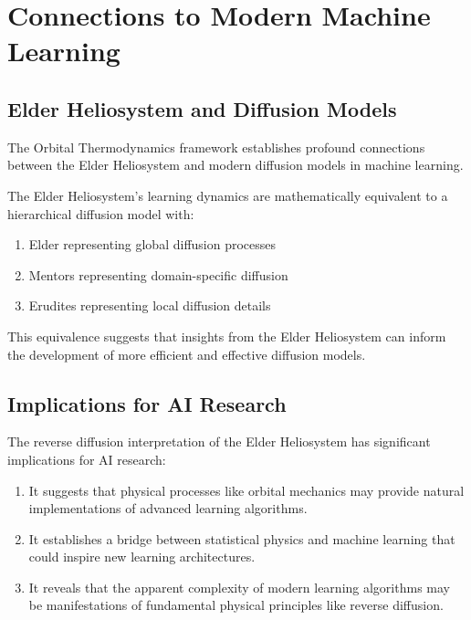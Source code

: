 \section{Connections to Modern Machine Learning}

\subsection{Elder Heliosystem and Diffusion Models}

The Orbital Thermodynamics framework establishes profound connections between the Elder Heliosystem and modern diffusion models in machine learning.

\begin{theorem}
The Elder Heliosystem's learning dynamics are mathematically equivalent to a hierarchical diffusion model with:
\begin{enumerate}
    \item Elder representing global diffusion processes
    \item Mentors representing domain-specific diffusion
    \item Erudites representing local diffusion details
\end{enumerate}
\end{theorem}

This equivalence suggests that insights from the Elder Heliosystem can inform the development of more efficient and effective diffusion models.

\subsection{Implications for AI Research}

The reverse diffusion interpretation of the Elder Heliosystem has significant implications for AI research:

\begin{enumerate}
    \item It suggests that physical processes like orbital mechanics may provide natural implementations of advanced learning algorithms.
    
    \item It establishes a bridge between statistical physics and machine learning that could inspire new learning architectures.
    
    \item It reveals that the apparent complexity of modern learning algorithms may be manifestations of fundamental physical principles like reverse diffusion.
\end{enumerate}

